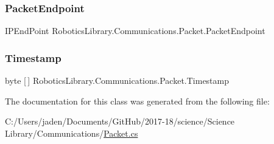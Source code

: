 \subsubsection{\texorpdfstring{Packet\+Endpoint}{PacketEndpoint}}
{\footnotesize\ttfamily I\+P\+End\+Point Robotics\+Library.\+Communications.\+Packet.\+Packet\+Endpoint\hspace{0.3cm}{\ttfamily [private]}}

\mbox{\label{class_robotics_library_1_1_communications_1_1_packet_aeaf9b3ec1923f1126c2025b1dd909468}} 
\subsubsection{\texorpdfstring{Timestamp}{Timestamp}}
{\footnotesize\ttfamily byte \mbox{[}$\,$\mbox{]} Robotics\+Library.\+Communications.\+Packet.\+Timestamp\hspace{0.3cm}{\ttfamily [private]}}



The documentation for this class was generated from the following file\+:\begin{DoxyCompactItemize}
\item 
C\+:/\+Users/jaden/\+Documents/\+Git\+Hub/2017-\/18/science/\+Science Library/\+Communications/\hyperlink{_packet_8cs}{Packet.\+cs}\end{DoxyCompactItemize}
